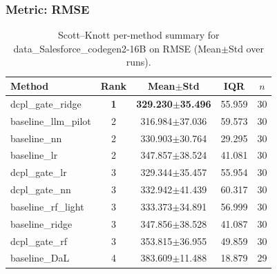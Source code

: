\subsubsection*{Metric: RMSE}
\begin{table}[H]
\centering
\scriptsize
\setlength{\tabcolsep}{4pt}
\renewcommand{\arraystretch}{1.1}
\caption{Scott--Knott per-method summary for data\_Salesforce\_codegen2-16B on RMSE (Mean$\pm$Std over runs).}
\label{tab:sk_data_Salesforce_codegen2-16B_RMSE}
\begin{tabular}{l|c|c|c|c}
\hline
\textbf{Method} & \textbf{Rank} & \textbf{Mean$\pm$Std} & \textbf{IQR} & \textbf{$n$} \\
\hline
\rowcolor{red!15} dcpl\_gate\_ridge & \textbf{1} & \textbf{329.230$\pm$35.496} & 55.959 & 30 \\
baseline\_llm\_pilot & 2 & 316.984$\pm$37.036 & 59.573 & 30 \\
baseline\_nn & 2 & 330.903$\pm$30.764 & 29.295 & 30 \\
baseline\_lr & 2 & 347.857$\pm$38.524 & 41.081 & 30 \\
dcpl\_gate\_lr & 3 & 329.344$\pm$35.457 & 55.954 & 30 \\
dcpl\_gate\_nn & 3 & 332.942$\pm$41.439 & 60.317 & 30 \\
baseline\_rf\_light & 3 & 333.373$\pm$34.891 & 56.999 & 30 \\
baseline\_ridge & 3 & 347.856$\pm$38.528 & 41.087 & 30 \\
dcpl\_gate\_rf & 3 & 353.815$\pm$36.955 & 49.859 & 30 \\
baseline\_DaL & 4 & 383.609$\pm$11.488 & 18.879 & 29 \\
\hline
\end{tabular}
\end{table}

